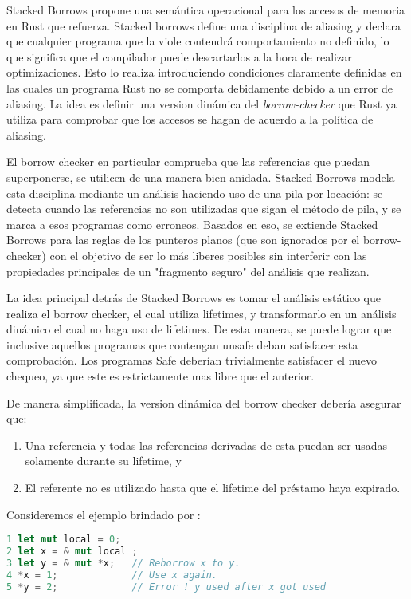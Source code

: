 Stacked Borrows \cite{stackedborrows} propone una semántica operacional para los accesos de memoria en Rust que refuerza. Stacked borrows define una disciplina de aliasing y declara que cualquier programa que la viole contendrá comportamiento no definido, lo que significa que el compilador puede descartarlos a la hora de realizar optimizaciones. Esto lo realiza introduciendo condiciones claramente definidas en las cuales un programa Rust no se comporta debidamente debido a un error de aliasing. La idea es definir una version dinámica del \textit{borrow-checker} que Rust ya utiliza para comprobar que los accesos se hagan de acuerdo a la política de aliasing.

El borrow checker en particular comprueba que las referencias que puedan superponerse, se utilicen de una manera bien anidada. Stacked Borrows modela esta disciplina mediante un análisis haciendo uso de una pila por locación: se detecta cuando las referencias no son utilizadas que sigan el método de pila, y se marca a esos programas como erroneos. Basados en eso, se extiende Stacked Borrows para las reglas de los punteros planos (que son ignorados por el borrow-checker) con el objetivo de ser lo más liberes posibles sin interferir con las propiedades principales de un "fragmento seguro" del análisis que realizan.

La idea principal detrás de Stacked Borrows es tomar el análisis estático que realiza el borrow checker, el cual utiliza lifetimes, y transformarlo en un análisis dinámico el cual no haga uso de lifetimes. De esta manera, se puede lograr que inclusive aquellos programas que contengan unsafe deban satisfacer esta comprobación. Los programas Safe deberían trivialmente satisfacer el nuevo chequeo, ya que este es estrictamente mas libre que el anterior.

De manera simplificada, la version dinámica del borrow checker debería asegurar que:
\begin{enumerate}
    \item Una referencia y todas las referencias derivadas de esta puedan ser usadas solamente durante su lifetime, y
    \item El referente no es utilizado hasta que el lifetime del préstamo haya expirado.
\end{enumerate}

Consideremos el ejemplo brindado por \cite{stackedborrows}:
\begin{lstlisting}[language=Rust]
1 let mut local = 0;
2 let x = & mut local ;
3 let y = & mut *x;   // Reborrow x to y.
4 *x = 1;             // Use x again.
5 *y = 2;             // Error ! y used after x got used
\end{lstlisting}

